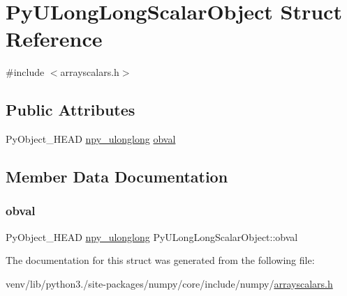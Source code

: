 \hypertarget{structPyULongLongScalarObject}{}\section{Py\+U\+Long\+Long\+Scalar\+Object Struct Reference}
\label{structPyULongLongScalarObject}


{\ttfamily \#include $<$arrayscalars.\+h$>$}

\subsection*{Public Attributes}
\begin{DoxyCompactItemize}
\item 
Py\+Object\+\_\+\+H\+E\+AD \hyperlink{npy__common_8h_a35c6a5dca1af8aedac67ca555323300a}{npy\+\_\+ulonglong} \hyperlink{structPyULongLongScalarObject_ae3f675eab855fcb593fee7bc9876d14f}{obval}
\end{DoxyCompactItemize}


\subsection{Member Data Documentation}
\mbox{\label{structPyULongLongScalarObject_ae3f675eab855fcb593fee7bc9876d14f}} 
\subsubsection{\texorpdfstring{obval}{obval}}
{\footnotesize\ttfamily Py\+Object\+\_\+\+H\+E\+AD \hyperlink{npy__common_8h_a35c6a5dca1af8aedac67ca555323300a}{npy\+\_\+ulonglong} Py\+U\+Long\+Long\+Scalar\+Object\+::obval}



The documentation for this struct was generated from the following file\+:\begin{DoxyCompactItemize}
\item 
venv/lib/python3./site-\/packages/numpy/core/include/numpy/\hyperlink{arrayscalars_8h}{arrayscalars.\+h}\end{DoxyCompactItemize}

